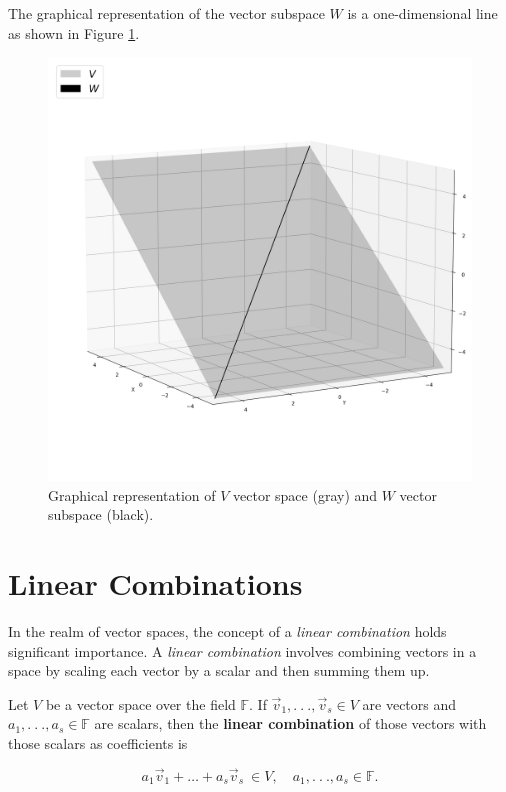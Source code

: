 The graphical representation of the vector subspace $W$ is a one-dimensional line as shown in Figure \ref{fig:vector-subspace-ex}.
\begin{figure}[h]
    \centering
    \includegraphics[scale=0.36]{Images/vector-subspace-ex.png}
    \caption{Graphical representation of $V$ vector space (gray) and $W$ vector subspace (black).}
    \label{fig:vector-subspace-ex}
\end{figure}
\newpage
\section{Linear Combinations}

In the realm of vector spaces, the concept of a \emph{linear combination} holds significant importance. A \emph{linear combination} involves combining vectors in a space by scaling each vector by a scalar and then summing them up. 


    Let $V$ be a vector space over the field $\mathbb F$. If $\vec{v}_1, . \ . \ ., \vec v_s \in V$ are vectors and $a_1, . \ . \ ., a_s \in \mathbb F$ are scalars, then the \textbf{linear combination} of those vectors with those scalars as coefficients is 

$$
a_1 \vec v_1 + \dots + a_s \vec v_s \ \in V, \quad a_1, . \ . \ ., a_s \in \mathbb F.
$$

